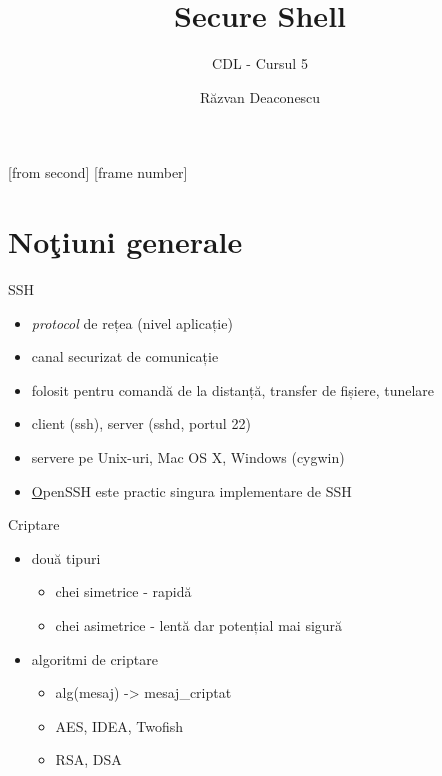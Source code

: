 \documentclass{beamer}
\title[Secure Shell]{Secure Shell}
\subtitle{CDL - Cursul 5}
\institute{ROSEdu}
\author{Răzvan Deaconescu}
\begin{document}
[from second]
[frame number]

\frame{\titlepage}

\frame{\tableofcontents}

\section{No\c{t}iuni generale}

\frame{\tableofcontents[currentsection]}

\begin{frame}{SSH}
  \begin{itemize}
    \item \emph{protocol} de rețea (nivel aplicație)
    \item canal securizat de comunicație
    \item folosit pentru comandă de la distanță, transfer de fișiere, tunelare
    \item client (ssh), server (sshd, portul 22)
    \item servere pe Unix-uri, Mac OS X, Windows (cygwin)
    \item \href{http://www.openssh.com/}OpenSSH este practic singura
implementare de SSH
  \end{itemize}
\end{frame}

\begin{frame}{Criptare}
  \begin{itemize}
    \item două tipuri
      \begin{itemize}
        \item chei simetrice - rapidă
        \item chei asimetrice - lentă dar potențial mai sigură
      \end{itemize}
    \item algoritmi de criptare
       \begin{itemize}
         \item alg(mesaj) -> mesaj\_criptat
         \item AES, IDEA, Twofish
         \item RSA, DSA
       \end{itemize}
  \end{itemize}
\end{frame}
\end{document}
